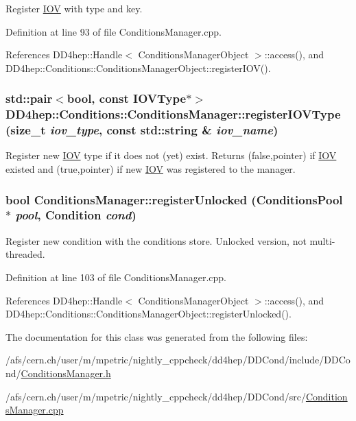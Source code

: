 Register \hyperlink{class_d_d4hep_1_1_i_o_v}{IOV} with type and key. 

Definition at line 93 of file ConditionsManager.cpp.

References DD4hep::Handle$<$ ConditionsManagerObject $>$::access(), and DD4hep::Conditions::ConditionsManagerObject::registerIOV().\hypertarget{class_d_d4hep_1_1_conditions_1_1_conditions_manager_a38ac3f64d572460cd8173ed386550330}{
\subsubsection[{registerIOVType}]{\setlength{\rightskip}{0pt plus 5cm}std::pair$<$bool, const {\bf IOVType}$\ast$$>$ DD4hep::Conditions::ConditionsManager::registerIOVType (size\_\-t {\em iov\_\-type}, \/  const std::string \& {\em iov\_\-name})}}
\label{class_d_d4hep_1_1_conditions_1_1_conditions_manager_a38ac3f64d572460cd8173ed386550330}


Register new \hyperlink{class_d_d4hep_1_1_i_o_v}{IOV} type if it does not (yet) exist. Returns (false,pointer) if \hyperlink{class_d_d4hep_1_1_i_o_v}{IOV} existed and (true,pointer) if new \hyperlink{class_d_d4hep_1_1_i_o_v}{IOV} was registered to the manager. \hypertarget{class_d_d4hep_1_1_conditions_1_1_conditions_manager_abd5482f92d8b86346c6fbd5865486075}{
\subsubsection[{registerUnlocked}]{\setlength{\rightskip}{0pt plus 5cm}bool ConditionsManager::registerUnlocked ({\bf ConditionsPool} $\ast$ {\em pool}, \/  {\bf Condition} {\em cond})}}
\label{class_d_d4hep_1_1_conditions_1_1_conditions_manager_abd5482f92d8b86346c6fbd5865486075}


Register new condition with the conditions store. Unlocked version, not multi-\/threaded. 

Definition at line 103 of file ConditionsManager.cpp.

References DD4hep::Handle$<$ ConditionsManagerObject $>$::access(), and DD4hep::Conditions::ConditionsManagerObject::registerUnlocked().

The documentation for this class was generated from the following files:\begin{DoxyCompactItemize}
\item 
/afs/cern.ch/user/m/mpetric/nightly\_\-cppcheck/dd4hep/DDCond/include/DDCond/\hyperlink{_conditions_manager_8h}{ConditionsManager.h}\item 
/afs/cern.ch/user/m/mpetric/nightly\_\-cppcheck/dd4hep/DDCond/src/\hyperlink{_conditions_manager_8cpp}{ConditionsManager.cpp}\end{DoxyCompactItemize}
